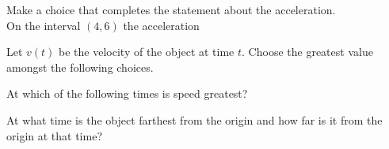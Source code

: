 \documentclass{ximera}
\begin{document}
\begin{exercise}
Make a choice that completes the statement about the acceleration.\\

On the interval $(4,6)$  the acceleration
\begin{multipleChoice}

\end{multipleChoice}
					
Let $v(t)$ be the velocity of the object at time $t$.  Choose the greatest value amongst the following choices.
\begin{multipleChoice}
\end{multipleChoice}

At which of the following times is speed greatest?
\begin{multipleChoice}
\end{multipleChoice}

At what time is the object farthest from the origin and how far is it from the origin at that time?
\begin{multipleChoice}
\end{multipleChoice}
\end{exercise}
\end{document}
